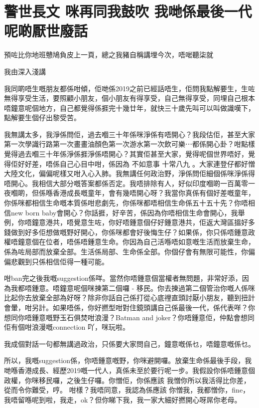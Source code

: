 \chapter{警世長文 咪再同我鼓吹 我哋係最後一代 呢啲厭世廢話}

預咗比你地班戇鳩負皮上一頁，總之我豬自稱講埋今次，唔啱聽柒就

我由深入淺講

我同啲唔生嘅朋友都係咁傾，佢哋係2019之前已經話唔生，佢問我點解要生，生咗無得享受生活，要照顧小朋友，個小朋友有得享受，自己無得享受，同埋自己根本唔鐘意呢個地方，自己都覺得係捱完十幾廿年，就快三十歲先叫可以叫做識嘆下，點解要生個仔出黎受苦。

我無講太多，我淨係問佢，過去嗰三十年係咪淨係有唔開心？我段估佢，甚至大家第一次學識行路第一次畫畫油顏色第一次游水第一次飲可樂⋯都係開心卦？咁點樣覺得過去嗰三十年係淨係捱淨係唔開心？其實佢甚至大家，覺得呢個世界唔好，覺得佢好好差，唔係自己心目中咁，係因為 不如意事 十常八九 。大家連登仔都好憎大陸文化，偏偏呢樣又咁入心入肺。我無講任何政治野，淨係問佢細個係咪淨係得唔開心。我相信大部分嘅答案都係否定。我唔排除有人，好似印度嗰啲一百萬零一夜嗰啲，但係喺香港成長嘅童年，會有幾唔開心呀？我當你真係有個好差嘅童年，你係咪都相信生命嘅本質係咁悲劇先，你係咪都唔相信生命係五十五十先？你唔相信new born baby會開心？你話捱，好辛苦，係因為你唔相信生命會開心，我舉例，你唔鐘意港共，唔覺意生咗，你好唔鍾意個仔好鍾意港共，佢返大灣區搵好多錢做到好多佢想做嘅野好開心，你係咪都會好後悔生仔？如果係，你只係唔鍾意政權唔鐘意個在位者，唔係唔鍾意生命。你因為自己活喺唔如意嘅生活而放棄生命，係為咗局部而放棄全部。生活係局部、生命係全部。你個仔會有無限可能性，你偏偏悲觀到只係相信佢得一種可能。

咁ban完之後我嘅suggestion係咩。當然你唔鍾意個當權者無問題，非常好添，因為我都唔鍾意。唔鐘意呢個咪揀第二個囉 - 移民。你去揀過第二個管治你嘅人係咪比起你去放棄全部為好呀？除非你話自己係打從心底𥚃直頭討厭小朋友，聽到扭計會暈，咁另計。如果唔係，你好撚型咁對住鏡頭講自己係最後一代，係代表咩？你想同你唔鍾意嘅野玉石俱焚咁浪漫？Batman and joker？你唔鍾意佢，仲點會想同佢有個咁浪漫嘅connection 吖，咪玩啦。

我成個對話一句都無講過政治，只係要大家問自己，鐘意嘅係乜，唔鐘意嘅係乜。

所以，我嘅suggestion係，你唔鍾意嘅野，你咪避開囉。放棄生命係最後手段，我哋喺香港成長、經歷2019嘅一代人，真係未至於要行呢一步。我假設你係唔鍾意個政權，你咪移民囉，之後生仔囉。你憎佢，你係應該 我憎你所以我活得比你差，從而令你難受，哼。 咁樣？我唔同意，我認為係應該 你憎我，我都憎你，fine，我唔留喺呢到啦，我走，ok？但你睇下我，我一家大細好撚開心呀屌你老母。

